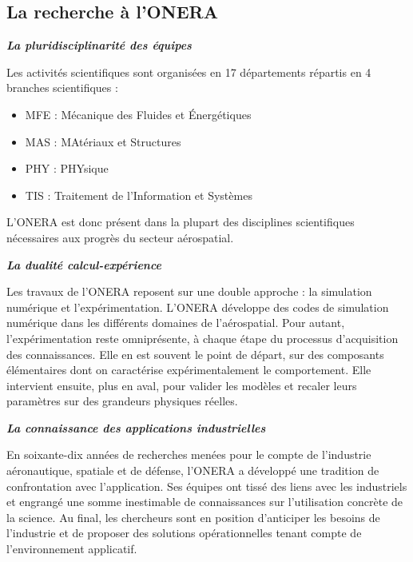 \subsection{La recherche à l'ONERA}
\textit{\textbf{La pluridisciplinarité des équipes}}

Les activités scientifiques sont organisées en 17 départements répartis en 4 branches scientifiques : 
\begin{itemize}
\item MFE : Mécanique des Fluides et Énergétiques
\item MAS : MAtériaux et Structures
\item PHY : PHYsique
\item TIS : Traitement de l'Information et Systèmes
\end{itemize}

L'ONERA est donc présent dans la plupart des disciplines scientifiques nécessaires aux progrès du secteur aérospatial. %

\textit{\textbf{La dualité calcul-expérience}}

Les travaux de l'ONERA reposent sur une double approche : la simulation numérique et l'expérimentation. L'ONERA développe des codes de simulation numérique dans les différents domaines de l'aérospatial. Pour autant, l'expérimentation reste omniprésente, à chaque étape du processus d'acquisition des connaissances. Elle en est souvent le point de départ, sur des composants élémentaires dont on caractérise expérimentalement le comportement. Elle intervient ensuite, plus en aval, pour valider les modèles et recaler leurs paramètres sur des grandeurs physiques réelles.
 
\textit{\textbf{La connaissance des applications industrielles}}

En soixante-dix années de recherches menées pour le compte de l'industrie aéronautique, spatiale et de défense, l'ONERA a développé une tradition de confrontation avec l'application. Ses équipes ont tissé des liens avec les industriels et engrangé une somme inestimable de connaissances sur l'utilisation concrète de la science. Au final, les chercheurs sont en position d'anticiper les besoins de l'industrie et de proposer des solutions opérationnelles tenant compte de l'environnement applicatif.

